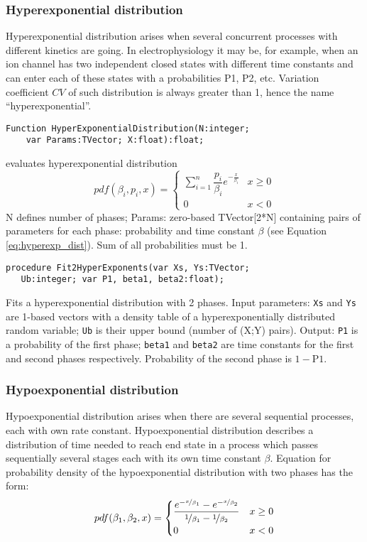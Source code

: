 \documentclass[12pt,a4paper,oneside]{article}
\newcommand{\code}[1]{\texttt{#1}}
\begin{document}
\subsubsection{Hyperexponential distribution}
Hyperexponential distribution arises when several concurrent processes with different kinetics are going. In electrophysiology it may be, for example, when an ion channel has two independent closed states with different time constants and can enter each of these states with a probabilities P1, P2, etc. Variation coefficient $CV$ of such distribution is always greater than 1, hence the name ``hyperexponential''.
\begin{verbatim}
Function HyperExponentialDistribution(N:integer; 
    var Params:TVector; X:float):float;
\end{verbatim}\vspace{-6pt}
evaluates hyperexponential distribution
\begin{equation}
pdf(\beta_i,p_i,x) = 
\begin{cases}
\displaystyle\sum_{i=1}^n \dfrac{p_i}{\beta_i} e^{-\frac{x}{\beta_i}} & x \geq 0 \\
0 & x < 0
\end{cases}
\label{eq:hyperexp_dist}
\end{equation}
N defines number of phases; Params: zero-based TVector[2*N] containing pairs of parameters for each phase: probability and time constant $\beta$ (see Equation \ref{eq:hyperexp_dist}). Sum of all probabilities must be 1. 
\begin{verbatim}
procedure Fit2HyperExponents(var Xs, Ys:TVector; 
   Ub:integer; var P1, beta1, beta2:float);
\end{verbatim}
Fits a hyperexponential distribution with 2 phases. Input parameters: \code{Xs} and \code{Ys} are 1-based vectors with a density table of a hyperexponentially distributed random variable; \code{Ub} is their upper bound (number of (X;Y) pairs). Output: \code{P1} is a probability of the first phase; \code{beta1} and \code{beta2} are time constants for the first and second phases respectively. Probability of the second phase is $1-\mathrm{P}1$.
\subsubsection{Hypoexponential distribution}
Hypoexponential distribution arises when there are several sequential processes, each with own rate constant. Hypoexponential distribution describes a distribution of time needed to reach end state in a process which passes sequentially several stages each with its own time constant $\beta$. Equation for probability density of the hypoexponential distribution with two phases has the form:
\begin{equation}
	pdf(\beta_1,\beta_2, x) = 
	\begin{cases}
		\dfrac{e^{-\nicefrac{x}{\beta_1}}-e^{-\nicefrac{x}{\beta_2}}}{\nicefrac{1}{\beta_1}-\nicefrac{1}{\beta_2}} & x \geq 0 \\
		0 & x<0
	\end{cases}
\end{equation}
   
\end{document}
